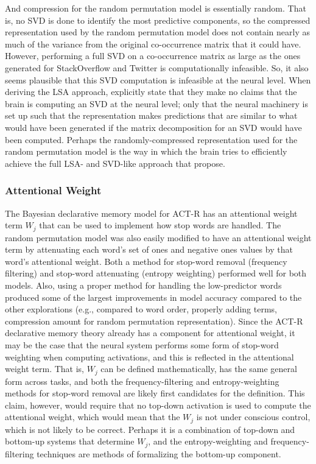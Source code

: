 \documentclass[man,floatsintext,donotrepeattitle]{apa6}
\begin{document}
And compression for the random permutation model is essentially random.
That is, no SVD is done to identify the most predictive components,
so the compressed representation used by the random permutation model does not contain nearly as much of the variance from the original co-occurrence matrix that it could have.
However, performing a full SVD on a co-occurrence matrix as large as the ones generated for StackOverflow and Twitter is computationally infeasible.
So, it also seems plausible that this SVD computation is infeasible at the neural level.
When deriving the LSA approach, \textcite{Landauer1997} explicitly state that they make no claims that the brain is computing an SVD at the neural level;
only that the neural machinery is set up such that the representation makes predictions that are similar to what would have been generated if the matrix decomposition for an SVD would have been computed.
Perhaps the randomly-compressed representation used for the random permutation model is the way in which the brain tries to efficiently achieve the full LSA- and SVD-like approach that \citeauthor{Landauer1997} propose.

\subsubsection{Attentional Weight}

The Bayesian declarative memory model for ACT-R has an attentional weight term $W_{j}$ that can be used to implement how stop words are handled.
The random permutation model was also easily modified to have an attentional weight term by attenuating each word's set of ones and negative ones values by that word's attentional weight.
Both a method for stop-word removal (frequency filtering) and stop-word attenuating (entropy weighting) performed well for both models.
Also, using a proper method for handling the low-predictor words produced some of the largest improvements in model accuracy compared to the other explorations
(e.g., compared to word order, properly adding terms, compression amount for random permutation representation).
Since the ACT-R declarative memory theory already has a component for attentional weight, it may be the case that the neural system performs some form of stop-word weighting when computing activations,
and this is reflected in the attentional weight term.
That is, $W_{j}$ can be defined mathematically, has the same general form across tasks, and both the frequency-filtering and entropy-weighting methods for stop-word removal are likely first candidates for the definition.
This claim, however, would require that no top-down activation is used to compute the attentional weight, which would mean that the $W_{j}$ is not under conscious control, which is not likely to be correct.
Perhaps it is a combination of top-down and bottom-up systems that determine $W_{j}$, and the entropy-weighting and frequency-filtering techniques are methods of formalizing the bottom-up component.
\end{document}
